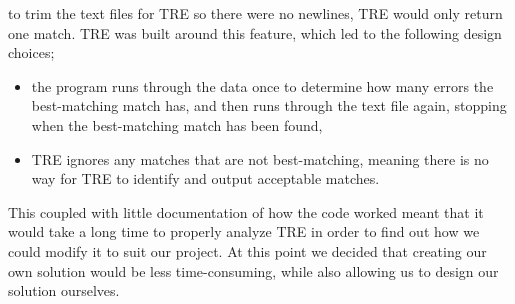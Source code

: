 to trim the text files for TRE so there were no newlines, TRE would only 
return one match. TRE was built around this feature, which led to the following 
design choices;
\begin{itemize}
\item the program runs through the data once to determine how many errors the 
best-matching match has, and then runs through the text file again, stopping 
when the best-matching match has been found, 
\item TRE ignores any matches that are not best-matching, meaning there is 
no way for TRE to identify and output acceptable matches.
\end{itemize}
This coupled with little documentation of how the code worked meant that it would 
take a long time to properly analyze TRE in order to find out how we could 
modify it to suit our project. At this point we decided that creating our 
own solution would be less time-consuming, while also allowing us to design our 
solution ourselves.

